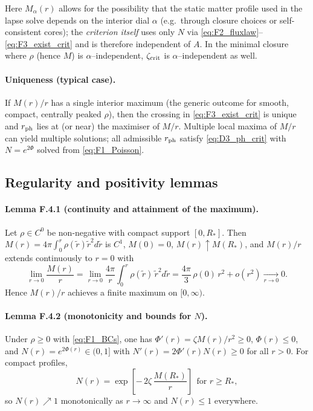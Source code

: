 \documentclass{iopjournal}
\begin{document}
Here $M_\alpha(r)$ allows for the possibility that the static matter profile used in the lapse solve depends on the interior dial $\alpha$ (e.g.\ through closure choices or self-consistent cores); the \emph{criterion itself} uses only $N$ via \eqref{eq:F2_fluxlaw}–\eqref{eq:F3_exist_crit} and is therefore independent of $A$. In the minimal closure where $\rho$ (hence $M$) is $\alpha$–independent, $\zeta_{\rm crit}$ is $\alpha$–independent as well.

\paragraph{Uniqueness (typical case).}
If $M(r)/r$ has a single interior maximum (the generic outcome for smooth, compact, centrally peaked $\rho$), then the crossing in \eqref{eq:F3_exist_crit} is unique and $r_{\rm ph}$ lies at (or near) the maximiser of $M/r$. Multiple local maxima of $M/r$ can yield multiple solutions; all admissible $r_{\rm ph}$ satisfy \eqref{eq:D3_ph_crit} with $N=e^{2\Phi}$ solved from \eqref{eq:F1_Poisson}.

\subsection{Regularity and positivity lemmas}\label{app:F4}
\paragraph{Lemma F.4.1 (continuity and attainment of the maximum).}
Let $\rho\in C^{0}$ be non-negative with compact support $[0,R_\ast]$. Then $M(r)=4\pi\!\int_{0}^{r}\rho(\tilde r)\tilde r^{2}d\tilde r$ is $C^{1}$, $M(0)=0$, $M(r)\uparrow M(R_\ast)$, and $M(r)/r$ extends continuously to $r=0$ with
\[
\lim_{r\to0}\frac{M(r)}{r}=\lim_{r\to0}\frac{4\pi}{r}\!\int_{0}^{r}\rho(\tilde r)\,\tilde r^{2}d\tilde r
=\frac{4\pi}{3}\,\rho(0)\,r^{2}+o(r^{2})\xrightarrow[r\to0]{}0.
\]
Hence $M(r)/r$ achieves a finite maximum on $[0,\infty)$.

\paragraph{Lemma F.4.2 (monotonicity and bounds for $N$).}
Under $\rho\ge0$ with \eqref{eq:F1_BCs}, one has $\Phi'(r)=\zeta M(r)/r^{2}\ge0$, $\Phi(r)\le0$, and $N(r)=e^{2\Phi(r)}\in(0,1]$ with $N'(r)=2\Phi'(r)N(r)\ge0$ for all $r>0$. For compact profiles,
\[
N(r)=\exp\!\left[-\,2\zeta\,\frac{M(R_\ast)}{r}\right]\ \ \text{for }r\ge R_\ast,
\]
so $N(r)\nearrow1$ monotonically as $r\to\infty$ and $N(r)\le1$ everywhere.
\end{document}
